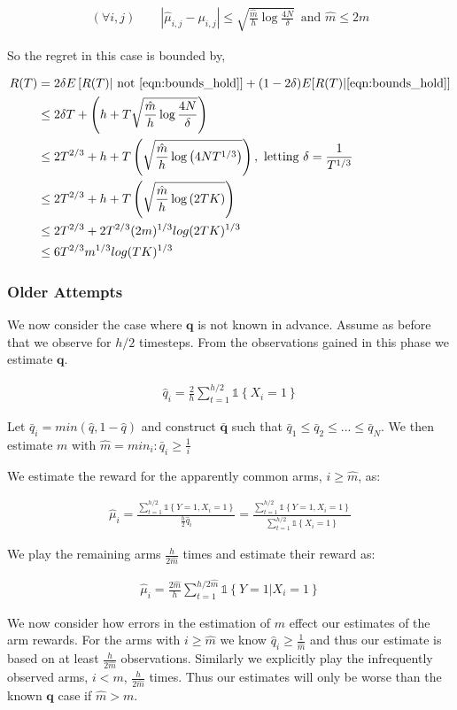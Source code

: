 \documentclass{article}
\newcommand{\set}[1]{\left\{#1\right\}}
\newcommand{\ind}[1]{\mathds{1}\!\!\set{#1}}
\newcommand{\eqn}[1]{\begin{align}#1\end{align}}
\newcommand{\eq}[1]{\begin{align*}#1\end{align*}}
\theoremstyle{plain}
\theoremstyle{definition}
\begin{document}
\eqn{
\label{eqn:bounds_hold}
(\forall i, j) \qquad \left|\hat \mu_{i,j} - \mu_{i,j}\right| \leq \sqrt{\frac{\hat m}{h} \log\frac{4N}{\delta}}\, \text { and } \hat{m} \leq 2m
}


So the regret in this case is bounded by,

\eq {
R(T) & =  2\delta E\left[R(T)|\text{ not } \cref{eqn:bounds_hold}\right] + (1-2\delta)E[R(T)| \cref{eqn:bounds_hold}]  \\
& \leq 2\delta T + \left(h + T\sqrt{\frac{\hat m}{h} \log\frac{4N}{\delta}} \right)\\
 &  \leq 2T^{2/3}  + h + T \left( \sqrt{\frac{\hat m}{h} \log \left(4NT^{1/3}\right)}\right), \text { letting } \delta = \frac{1}{T^{1/3}} \\
&  \leq 2T^{2/3} + h + T \left( \sqrt{\frac{\hat m}{h} \log \left(2TK\right)}\right) \\
&  \leq 2T^{2/3}  + 2T^{2/3}(2m)^{1/3}log(2TK)^{1/3}  \\
&  \leq 6T^{2/3}m^{1/3}log(TK)^{1/3}  \\
}



\subsubsection{ Older Attempts}
We now consider the case where $\boldsymbol{q}$ is not known in advance. Assume as before that we observe for $h/2$ timesteps. From the observations gained in this phase we estimate $\boldsymbol{q}$.

\eqn{
\hat{q}_i = \frac{2}{h}\sum_{t=1}^{h/2}\ind{X_i=1}
}

Let $\bar{q}_i = min(\hat{q},1-\hat{q})$ and construct $\bar{\boldsymbol{q}}$ such that $\bar{q}_1 \leq \bar{q}_2 \leq ...\leq \bar{q}_N$. We then estimate $m$ with $\hat{m} = min_i : \bar{q}_i \geq \frac{1}{i}$  

We estimate the reward for the apparently common arms, $i \geq \hat{m}$, as:

\eqn{
\hat{\mu}_i = \frac{\sum_{t=1}^{h/2}\ind{Y = 1,X_i = 1}}{\frac{h}{2}\hat{q}_i} = \frac{\sum_{t=1}^{h/2}\ind{Y = 1,X_i = 1}}{\sum_{t=1}^{h/2}\ind{X_i=1}}
}

We play the remaining arms $\frac{h}{2\hat{m}}$ times and estimate their reward as:

\eqn{
\hat{\mu}_i = \frac{2\hat{m}}{h}\sum_{t=1}^{h/2\hat{m}}\ind{Y = 1|X_i=1}
}

We now consider how errors in the estimation of $m$ effect our estimates of the arm rewards. For the arms with $i \geq \hat{m}$ we know $\hat{q}_i \geq \frac{1}{\hat{m}}$ and thus our estimate is based on at least $\frac{h}{2\hat{m}}$ observations. Similarly we explicitly play the infrequently observed arms, $i < m$,  $\frac{h}{2\hat{m}}$ times. Thus our estimates will only be worse than the known $\boldsymbol{q}$ case if $\hat{m} > m$. 
\end{document}

